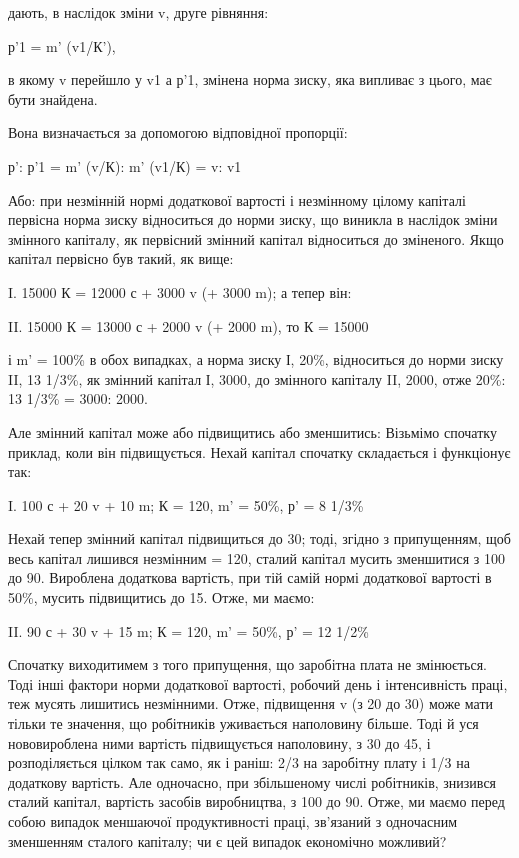 дають, в наслідок зміни v, друге рівняння:

р'1 = m' (v1/К'),

в якому v перейшло у v1 а р'1, змінена норма зиску, яка випливає
з цього, має бути знайдена.

Вона визначається за допомогою відповідної пропорції:

р': р'1 = m' (v/К): m' (v1/К) = v: v1

Або: при незмінній нормі додаткової вартості і незмінному цілому
капіталі первісна норма зиску відноситься до норми зиску,
що виникла в наслідок зміни змінного капіталу, як первісний
змінний капітал відноситься до зміненого.
Якщо капітал первісно був такий, як вище:

I. 15000 К = 12000 с + 3000 v (+ 3000 m); а тепер він:

II. 15000 К = 13000 с + 2000 v (+ 2000 m), то К = 15000

і m' = 100\% в обох випадках, а норма зиску І, 20\%, відноситься
до норми зиску II, 13 1/3\%, як змінний капітал І, 3000,
до змінного капіталу II, 2000, отже 20\%: 13 1/3\% = 3000: 2000.

Але змінний капітал може або підвищитись або зменшитись:
Візьмімо спочатку приклад, коли він підвищується. Нехай капітал
спочатку складається і функціонує так:

I. 100 с + 20 v + 10 m; К = 120, m' = 50\%, р' = 8 1/3\%

Нехай тепер змінний капітал підвищиться до 30; тоді, згідно
з припущенням, щоб весь капітал лишився незмінним = 120, сталий
капітал мусить зменшитися з 100 до 90. Вироблена додаткова
вартість, при тій самій нормі додаткової вартості в 50\%, мусить
підвищитись до 15. Отже, ми маємо:

II. 90 с + 30 v + 15 m; К = 120, m' = 50\%, р' = 12 1/2\%

Спочатку виходитимем з того припущення, що заробітна
плата не змінюється. Тоді інші фактори норми додаткової вартості,
робочий день і інтенсивність праці, теж мусять лишитись
незмінними. Отже, підвищення v (з 20 до 30) може мати тільки
те значення, що робітників уживається наполовину більше.
Тоді й уся нововироблена ними вартість підвищується наполовину,
з 30 до 45, і розподіляється цілком так само, як і раніш:
2/3 на заробітну плату і 1/3 на додаткову вартість. Але одночасно,
при збільшеному числі робітників, знизився сталий капітал,
вартість засобів виробництва, з 100 до 90. Отже, ми маємо
перед собою випадок меншаючої продуктивності праці, зв’язаний
з одночасним зменшенням сталого капіталу; чи є цей випадок
економічно можливий?

